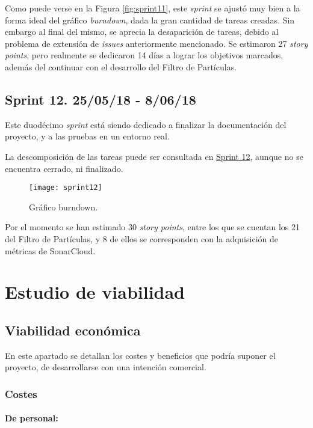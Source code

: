 Como puede verse en la Figura \ref{fig:sprint11}, este \emph{sprint} se ajustó muy bien a la forma ideal del gráfico \emph{burndown}, dada la gran cantidad de tareas creadas. Sin embargo al final del mismo, se aprecia la desaparición de tareas, debido al problema de extensión de \emph{issues} anteriormente mencionado.
Se estimaron 27 \emph{story points}, pero realmente se dedicaron 14 días a lograr los objetivos marcados, además del continuar con el desarrollo del Filtro de Partículas.

\subsection{Sprint 12. 25/05/18 - 8/06/18}

Este duodécimo \emph{sprint} está siendo dedicado a finalizar la documentación del proyecto, y a las pruebas en un entorno real. 

La descomposición de las tareas puede ser consultada en \href{https://github.com/mbm0089/gii_0_17.02_snsi/milestone/11}{Sprint 12}, aunque no se encuentra cerrado, ni finalizado.

\begin{figure}[H]
	\centering
	\texttt{[image: sprint12]}
	\caption[Burndown Sprint 12]{Gráfico burndown.}\label{fig:sprint12}
\end{figure}

Por el momento se han estimado 30 \emph{story points}, entre los que se cuentan los 21 del Filtro de Partículas, y 8 de ellos se corresponden con la adquisición de métricas de SonarCloud.  



\section{Estudio de viabilidad}

\subsection{Viabilidad económica}

En este apartado se detallan los costes y beneficios que podría suponer el proyecto, de desarrollarse con una intención comercial. 

\subsubsection{Costes}

\paragraph{De personal:}


